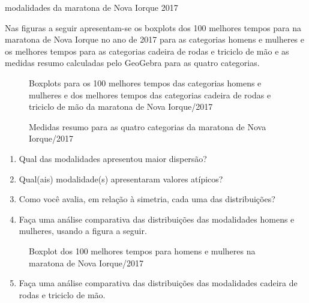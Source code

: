 \begin{task}{modalidades da maratona de Nova Iorque 2017}
\label{\detokenize{PE104-7:ativ-comparacaodegruposusandoboxplot}}\label{\detokenize{PE104-7:atividade-modalidades-da-maratona-de-nova-iorque-2017}}

Nas figuras a seguir apresentam-se os boxplots dos 100 melhores tempos para na maratona de Nova Iorque no ano de 2017 para as categorias homens e mulheres e os melhores tempos para as categorias cadeira de rodas e triciclo de mão e as medidas resumo calculadas pelo GeoGebra para as quatro categorias.

\begin{figure}[H]
\centering
\capstart

\noindent{}
\caption{Boxplots para os 100 melhores tempos das categorias homens e mulheres e dos melhores tempos das categorias cadeira de rodas e triciclo de mão da maratona de Nova Iorque/2017}\label{\detokenize{PE104-7:fig-boxplotsmaratona}}\label{\detokenize{PE104-7:id1}}\end{figure}

\begin{figure}[H]
\centering
\capstart

\noindent{}
\caption{Medidas resumo para as quatro categorias da maratona de Nova Iorque/2017}\label{\detokenize{PE104-7:fig-medidasresumo4categorias}}\label{\detokenize{PE104-7:id2}}\end{figure}
\begin{enumerate}
\item {} 
Qual das modalidades apresentou maior dispersão?

\item {} 
Qual(ais) modalidade(s) apresentaram valores atípicos?

\item {} 
Como você avalia, em relação à simetria, cada uma das distribuições?

\item {} 
Faça uma análise comparativa das distribuições das modalidades homens e mulheres, usando a figura a seguir.

\end{enumerate}

\begin{figure}[H]
\centering
\capstart

\noindent{}
\caption{Boxplot dos 100 melhores tempos para homens e mulheres na maratona de Nova Iorque/2017}\label{\detokenize{PE104-7:fig-boxplothm}}\label{\detokenize{PE104-7:id3}}\end{figure}
\begin{enumerate}
\setcounter{enumi}{4}
\item {} 
Faça uma análise comparativa das distribuições das modalidades cadeira de rodas e triciclo de mão.

\end{enumerate}
\end{task}




